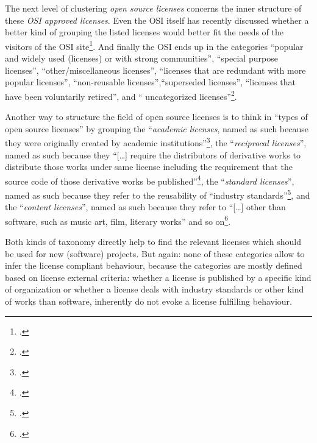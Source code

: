 The next level of clustering \emph{open source licenses} concerns the inner
structure of these \emph{OSI approved licenses}. Even the OSI itself has recently
discussed whether a better kind of grouping the listed licenses would better fit
the needs of the visitors of the OSI site\footcite[cf.][\nopage wp]{OSI2013a}.
And finally the OSI ends up in the categories \enquote{popular and widely used
(licenses) or with strong communities}, \enquote{special purpose licenses},
\enquote{other/miscellaneous licenses}, \enquote{licenses that are redundant
with more popular licenses}, \enquote{non-reusable licenses},\enquote{superseded
licenses}, \enquote{licenses that have been voluntarily retired}, and \enquote{
uncategorized licenses}\footcite[cf.][\nopage wp]{OSI2013b}.

Another way to structure the field of open source licenses is to think in
\enquote{types of open source licenses} by grouping the \enquote{\emph{academic
licenses}, named as such because they were originally created by academic
institutions}\footcite[cf.][69]{Rosen2005a}, the \enquote{\emph{reciprocal
licenses}}, named as such because they \enquote{[\ldots] require the
distributors of derivative works to dis\-tri\-bu\-te those works under same
license including the requirement that the source code of those derivative works
be published}\footcite[cf.][70]{Rosen2005a}, the \enquote{\emph{standard
licenses}}, named as such because they refer to the reusability of
\enquote{industry standards}\footcite[cf.][70]{Rosen2005a}, and the
\enquote{\emph{content licenses}}, named as such because they refer to
\enquote{[\ldots] other than software, such as music art, film, literary works}
and so on\footcite[cf.][71]{Rosen2005a}.

Both kinds of taxonomy directly help to find the relevant licenses which should
be used for new (software) projects. But again: none of these categories 
allow to infer the license compliant behaviour, because the categories are
mostly defined based on license external criteria: whether a license is
published by a specific kind of organization or whether a license deals with
industry standards or other kind of works than software, inherently do not
evoke a license fulfilling behaviour.

